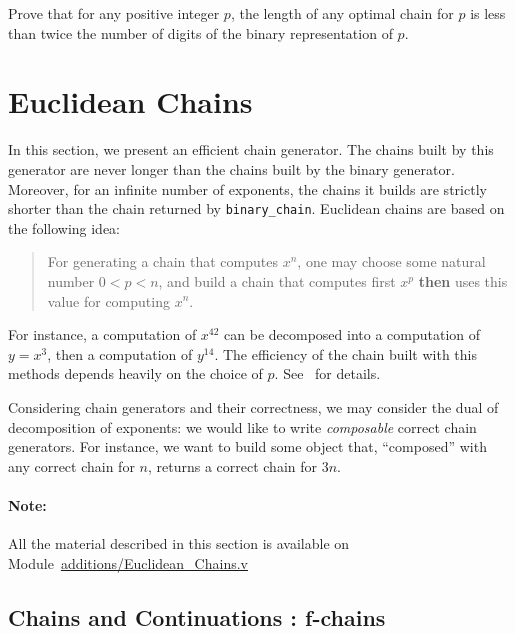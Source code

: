 \begin{exercise}
Prove that for any positive integer $p$,  the length of any optimal chain 
for $p$ is less  than twice the number of digits of the binary representation of $p$.
\end{exercise}







\section{Euclidean Chains}
\label{euclide-sect}

In this section, we present an efficient chain generator. The chains built by this generator
are never longer than the chains built by the binary generator. Moreover, for an 
infinite number of exponents, the chains it builds are strictly shorter than the chain
returned by \texttt{binary\_chain}. 
Euclidean chains are based on the following idea: 
\begin{quote}
For generating a chain that computes $x^n$, one may choose some natural number
$0<p<n$, and build a chain that computes first $x^p$ \textbf{then} uses this value
for computing $x^n$. 
\end{quote}

For instance, a  computation of $x^{42}$ can be decomposed into a computation 
of $y=x^3$, then a computation of $y^{14}$. The efficiency of the chain built with this
methods depends heavily on the choice of $p$. See~\cite{DBLP:journals/ita/BrlekCHM95} for details.

Considering chain generators and their correctness, we may consider the dual of 
decomposition of exponents: we would like to write \emph{composable} correct 
chain generators. For instance, we want to build some object that, ``composed''  
with any correct chain for $n$, returns a correct chain for $3n$.

\paragraph{Note:}
All the \coq{} material described in this section is available on 
 Module~\href{../theories/html/hydras.additions.Euclidean_Chains.html}{additions/Euclidean\_Chains.v}

\subsection{Chains and Continuations : f-chains}


